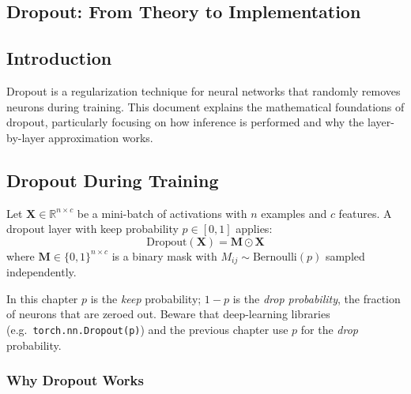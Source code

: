 \begin{notechapter}
\chapter{Dropout: From Theory to Implementation}\label{ch:dropout-inference}

\section{Introduction}

Dropout is a regularization technique for neural networks that randomly removes neurons during training. This document explains the mathematical foundations of dropout, particularly focusing on how inference is performed and why the layer-by-layer approximation works.

\section{Dropout During Training}

\begin{definition}
Let $\mathbf{X} \in \mathbb{R}^{n \times c}$ be a mini-batch of activations with $n$ examples and $c$ features. A dropout layer with keep probability $p \in [0, 1]$ applies:
\begin{equation}
\text{Dropout}(\mathbf{X}) = \mathbf{M} \odot \mathbf{X}
\end{equation}
where $\mathbf{M} \in \{0, 1\}^{n \times c}$ is a binary mask with $M_{ij} \sim \text{Bernoulli}(p)$ sampled independently.
\end{definition}

\begin{remark}
In this chapter \( p \) is the \emph{keep} probability; \( 1 - p \) is the \emph{drop probability}, the fraction of neurons that are zeroed out. Beware that deep-learning libraries (e.g.\ \texttt{torch.nn.Dropout(p)}) and the previous chapter use \( p \) for the \emph{drop} probability.
\end{remark}

\subsection{Why Dropout Works}


\end{notechapter}
